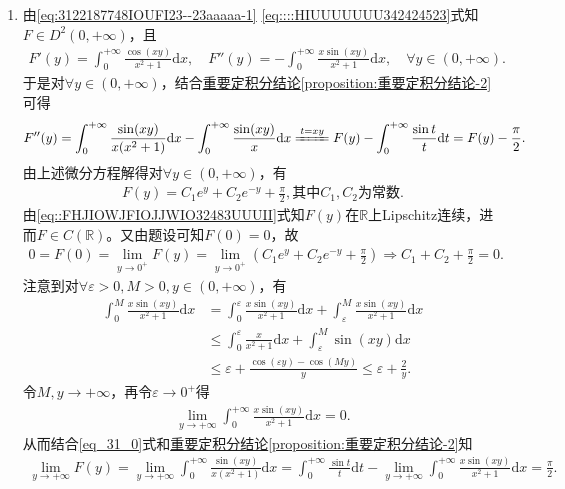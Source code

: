 \documentclass[../../main.tex]{subfiles}%
\begin{document}
\begin{solution}
\begin{enumerate}[(1)]
\item 由\eqref{eq:3122187748IOUFI23--23aaaaa-1}
\eqref{eq::::HIUUUUUUU342424523}式知$F\in D^2(0,+\infty)$，且
\begin{align*}
F'(y)=\int_0^{+\infty}\frac{\cos(xy)}{x^2+1}\mathrm{d}x,\quad F''(y)=-\int_0^{+\infty}\frac{x\sin(xy)}{x^2+1}\mathrm{d}x,\quad \forall y\in(0,+\infty).
\end{align*}
于是对$\forall y\in(0,+\infty)$，结合\hyperref[proposition:重要定积分结论-2]{重要定积分结论\ref{proposition:重要定积分结论-2}}可得
\begin{align}
F''(y)=\int_0^{+\infty}\frac{\sin(xy)}{x(x^2+1)}\mathrm{d}x-\int_0^{+\infty}\frac{\sin(xy)}{x}\mathrm{d}x\xlongequal{t=xy}F(y)-\int_0^{+\infty}\frac{\sin t}{t}\mathrm{d}t=F(y)-\frac{\pi}{2}.\label{eq_31_0}
\end{align}
由上述微分方程解得对$\forall y\in(0,+\infty)$，有
\begin{align}
F(y)=C_1e^y+C_2e^{-y}+\frac{\pi}{2},\text{其中}C_1,C_2\text{为常数}.\label{eq_31_3}
\end{align}
由\eqref{eq::FHJIOWJFIOJJWIO32483UUUII}式知$F(y)$在$\mathbb{R}$上Lipschitz连续，进而$F\in C(\mathbb{R})$。又由题设可知$F(0)=0$，故
\begin{align}
0=F(0)=\lim\limits_{y\to0^+}F(y)=\lim\limits_{y\to0^+}\left(C_1e^y+C_2e^{-y}+\frac{\pi}{2}\right)\Longrightarrow C_1+C_2+\frac{\pi}{2}=0.\label{eq_31_4}
\end{align}
注意到对$\forall \varepsilon>0,M>0,y\in(0,+\infty)$，有
\begin{align*}
\int_0^M\frac{x\sin(xy)}{x^2+1}\mathrm{d}x&=\int_0^\varepsilon\frac{x\sin(xy)}{x^2+1}\mathrm{d}x+\int_\varepsilon^M\frac{x\sin(xy)}{x^2+1}\mathrm{d}x\\
&\leqslant\int_0^\varepsilon\frac{x}{x^2+1}\mathrm{d}x+\int_\varepsilon^M\sin(xy)\mathrm{d}x\\
&\leqslant\varepsilon+\frac{\cos(\varepsilon y)-\cos(My)}{y}\leqslant\varepsilon+\frac{2}{y}.
\end{align*}
令$M,y\to+\infty$，再令$\varepsilon\to0^+$得
\begin{align*}
\lim\limits_{y\to+\infty}\int_0^{+\infty}\frac{x\sin(xy)}{x^2+1}\mathrm{d}x=0.
\end{align*}
从而结合\eqref{eq_31_0}式和\hyperref[proposition:重要定积分结论-2]{重要定积分结论\ref{proposition:重要定积分结论-2}}知
\begin{align*}
\lim\limits_{y\to+\infty}F(y)=\lim\limits_{y\to+\infty}\int_0^{+\infty}\frac{\sin(xy)}{x(x^2+1)}\mathrm{d}x=\int_0^{+\infty}\frac{\sin t}{t}\mathrm{d}t-\lim\limits_{y\to+\infty}\int_0^{+\infty}\frac{x\sin(xy)}{x^2+1}\mathrm{d}x=\frac{\pi}{2}.

\end{align*}
\end{enumerate}
\end{solution}
\end{document}
